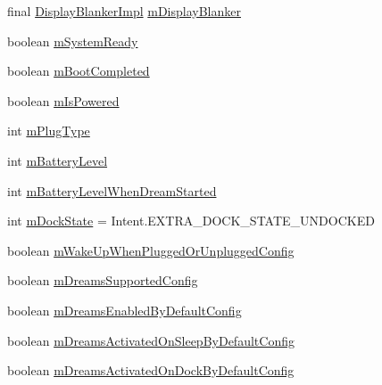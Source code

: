 \begin{DoxyCompactItemize}
\item 
final \hyperlink{classcom_1_1android_1_1server_1_1power_1_1PowerManagerService_1_1DisplayBlankerImpl}{Display\-Blanker\-Impl} \hyperlink{classcom_1_1android_1_1server_1_1power_1_1PowerManagerService_a6702009d7541f2a7f92a6dd548afede2}{m\-Display\-Blanker}
\item 
boolean \hyperlink{classcom_1_1android_1_1server_1_1power_1_1PowerManagerService_a9a5e6545c4fc296a928224b076532272}{m\-System\-Ready}
\item 
boolean \hyperlink{classcom_1_1android_1_1server_1_1power_1_1PowerManagerService_a480e8b314f537ff22298df8ca38af90c}{m\-Boot\-Completed}
\item 
boolean \hyperlink{classcom_1_1android_1_1server_1_1power_1_1PowerManagerService_aac18b8c361ea4cc03d1564e78e071653}{m\-Is\-Powered}
\item 
int \hyperlink{classcom_1_1android_1_1server_1_1power_1_1PowerManagerService_a80525836b592acfc57859cc2bf7d7105}{m\-Plug\-Type}
\item 
int \hyperlink{classcom_1_1android_1_1server_1_1power_1_1PowerManagerService_a5d7a0488db54dc52626cc7101bbab760}{m\-Battery\-Level}
\item 
int \hyperlink{classcom_1_1android_1_1server_1_1power_1_1PowerManagerService_a87e43214bec37e3501d95b0c5ca86107}{m\-Battery\-Level\-When\-Dream\-Started}
\item 
int \hyperlink{classcom_1_1android_1_1server_1_1power_1_1PowerManagerService_aa8f4e3b43061eaa7e594dddc3720778e}{m\-Dock\-State} = Intent.\-E\-X\-T\-R\-A\-\_\-\-D\-O\-C\-K\-\_\-\-S\-T\-A\-T\-E\-\_\-\-U\-N\-D\-O\-C\-K\-E\-D
\item 
boolean \hyperlink{classcom_1_1android_1_1server_1_1power_1_1PowerManagerService_a18d80fbc49da1743891384c91fa711a5}{m\-Wake\-Up\-When\-Plugged\-Or\-Unplugged\-Config}
\item 
boolean \hyperlink{classcom_1_1android_1_1server_1_1power_1_1PowerManagerService_af700b9eb40742ef9d93fdbfdb9d7b10b}{m\-Dreams\-Supported\-Config}
\item 
boolean \hyperlink{classcom_1_1android_1_1server_1_1power_1_1PowerManagerService_a491b8d99324daa76880faa8a8029603b}{m\-Dreams\-Enabled\-By\-Default\-Config}
\item 
boolean \hyperlink{classcom_1_1android_1_1server_1_1power_1_1PowerManagerService_a6b4f5bd99a7c1969c05877f69a92b54d}{m\-Dreams\-Activated\-On\-Sleep\-By\-Default\-Config}
\item 
boolean \hyperlink{classcom_1_1android_1_1server_1_1power_1_1PowerManagerService_a631caaf3c3456e1343677b641d8fe8af}{m\-Dreams\-Activated\-On\-Dock\-By\-Default\-Config}

\end{DoxyCompactItemize}
